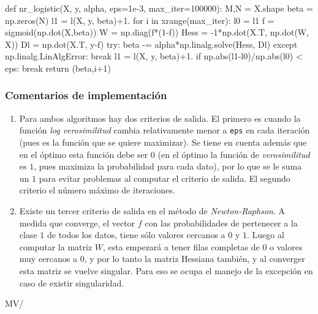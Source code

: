 \documentclass[spanish, fleqn]{article}
\begin{document}
\begin{python}
def nr_logistic(X, y, alpha, eps=1e-3, max_iter=100000):
    M,N = X.shape
    beta = np.zeros(N)
    l1 = l(X, y, beta)+1.
    for i in xrange(max_iter):
        l0 = l1
        f = sigmoid(np.dot(X,beta))
        W = np.diag(f*(1-f))
        Hess = -1*np.dot(X.T, np.dot(W, X))
        Dl = np.dot(X.T, y-f)
        try:
            beta -= alpha*np.linalg.solve(Hess, Dl)
        except np.linalg.LinAlgError:
            break
        l1 = l(X, y, beta)+1.
        if np.abs(l1-l0)/np.abs(l0) < eps: break
    return (beta,i+1)
\end{python}

\subsubsection*{Comentarios de implementación}
\begin{enumerate}
	\item Para ambos algoritmos hay dos criterios de salida. El primero es cuando la función \textit{log verosimilitud} cambia relativamente menor a \texttt{eps} en cada iteración (pues es la función que se quiere maximizar). Se tiene en cuenta además que en el óptimo esta función debe ser $0$ (en el óptimo la función de \textit{verosimilitud} es $1$, pues maximiza la probabilidad para cada dato), por lo que se le suma un $1$ para evitar problemas al computar el criterio de salida. El segundo criterio el número máximo de iteraciones.
	\item Existe un tercer criterio de salida en el método de \textit{Newton-Raphson}. A medida que converge, el vector $f$ con las probabilidades de pertenecer a la clase $1$ de todos los datos, tiene sólo valores cercanos a $0$ y $1$. Luego al computar la matriz $W$, esta empezará a tener filas completas de $0$ o valores muy cercanos a $0$, y por lo tanto la matriz Hessiana también, y al converger esta matriz se vuelve singular. Para eso se ocupa el manejo de la excepción en caso de existir singularidad.

\end{enumerate}

\vfill\hfill MV/\LaTeXe
\end{document}
